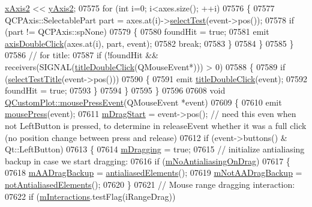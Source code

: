 \begin{DoxyCode}
      \hyperlink{a00116_a058f6d3a4c86bf94c476e5c380711dba}{xAxis2} << \hyperlink{a00116_a4fd6679232da7da0a1ae4e1b6ae83d6e}{yAxis2};
07575     \textcolor{keywordflow}{for} (\textcolor{keywordtype}{int} i=0; i<axes.size(); ++i)
07576     \{
07577       QCPAxis::SelectablePart part = axes.at(i)->\hyperlink{a00025_a940be5ef61f4fa0dc21e4f4c7a5875c2}{selectTest}(event->pos());
07578       \textcolor{keywordflow}{if} (part != QCPAxis::spNone)
07579       \{
07580         foundHit = \textcolor{keyword}{true};
07581         emit \hyperlink{a00116_a6df35357460181a72da3e93d600f5256}{axisDoubleClick}(axes.at(i), part, event);
07582         \textcolor{keywordflow}{break};
07583       \}
07584     \}
07585   \}
07586   \textcolor{comment}{// for title:}
07587   \textcolor{keywordflow}{if} (!foundHit && receivers(SIGNAL(\hyperlink{a00116_a854db02b12e8df49b5f998f17e8ee770}{titleDoubleClick}(QMouseEvent*))) > 0)
07588   \{
07589     \textcolor{keywordflow}{if} (\hyperlink{a00116_a2a2d01a092840ac01b16104f7973f831}{selectTestTitle}(event->pos()))
07590     \{
07591       emit \hyperlink{a00116_a854db02b12e8df49b5f998f17e8ee770}{titleDoubleClick}(event);
07592       foundHit = \textcolor{keyword}{true};
07593     \}
07594   \}
07595 \}
07596 
07608 \textcolor{keywordtype}{void} \hyperlink{a00116_a460b092e82c0eb94ef6c32a10acc822a}{QCustomPlot::mousePressEvent}(QMouseEvent *event)
07609 \{
07610   emit \hyperlink{a00116_aca75bf9afb5dd19349c375de2a87a051}{mousePress}(event);
07611   \hyperlink{a00116_a23a3ce3b031eef6349252229446f3665}{mDragStart} = \textcolor{keyword}{event}->pos(); \textcolor{comment}{// need this even when not LeftButton is pressed, to determine in
       releaseEvent whether it was a full click (no position change between press and release)}
07612   \textcolor{keywordflow}{if} (event->buttons() & Qt::LeftButton)
07613   \{
07614     \hyperlink{a00116_ad1273fad7e12b0f61819343368778928}{mDragging} = \textcolor{keyword}{true};
07615     \textcolor{comment}{// initialize antialiasing backup in case we start dragging:}
07616     \textcolor{keywordflow}{if} (\hyperlink{a00116_abfc5e49800e5ca84fa6312b9bb814b3b}{mNoAntialiasingOnDrag})
07617     \{
07618       \hyperlink{a00116_ac6e9f4d75a28eb37ee454e1907655e8b}{mAADragBackup} = \hyperlink{a00116_acc24388098ddb95f5a651cede3f34b99}{antialiasedElements}();
07619       \hyperlink{a00116_aac79a49a340f3e5b06465bb730431013}{mNotAADragBackup} = \hyperlink{a00116_ad611ed86732d07774545f5bd4b7f18b7}{notAntialiasedElements}();
07620     \}
07621     \textcolor{comment}{// Mouse range dragging interaction:}
07622     \textcolor{keywordflow}{if} (\hyperlink{a00116_af8d040767753acc548b2368dd4150ae6}{mInteractions}.testFlag(iRangeDrag))

\end{DoxyCode}
